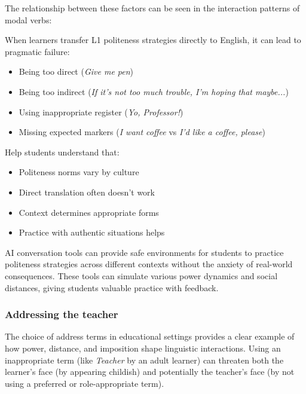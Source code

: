 The relationship between these factors can be seen in the interaction patterns of modal verbs:
\ea \label{ex:modal-patterns}
    \z
\z

\begin{tcolorbox}[title=Cross-cultural Pragmatic Failure, colback=white]
When learners transfer L1 politeness strategies directly to English, it can lead to pragmatic failure:
\begin{itemize}[noitemsep]
    \item Being too direct (\textit{Give me pen})
    \item Being too indirect (\textit{If it's not too much trouble, I'm hoping that maybe...})
    \item Using inappropriate register (\textit{Yo, Professor!})
    \item Missing expected markers (\textit{I want coffee} vs \textit{I'd like a coffee, please})
\end{itemize}

Help students understand that:
\begin{itemize}[noitemsep]
    \item Politeness norms vary by culture
    \item Direct translation often doesn't work
    \item Context determines appropriate forms
    \item Practice with authentic situations helps
\end{itemize}

AI conversation tools can provide safe environments for students to practice politeness strategies across different contexts without the anxiety of real-world consequences. These tools can simulate various power dynamics and social distances, giving students valuable practice with feedback.
\end{tcolorbox}

\subsubsection*{Addressing the teacher}
The choice of address terms in educational settings provides a clear example of how power, distance, and imposition shape linguistic interactions. Using an inappropriate term (like \textit{Teacher} by an adult learner) can threaten both the learner's face (by appearing childish) and potentially the teacher's face (by not using a preferred or role-appropriate term).


